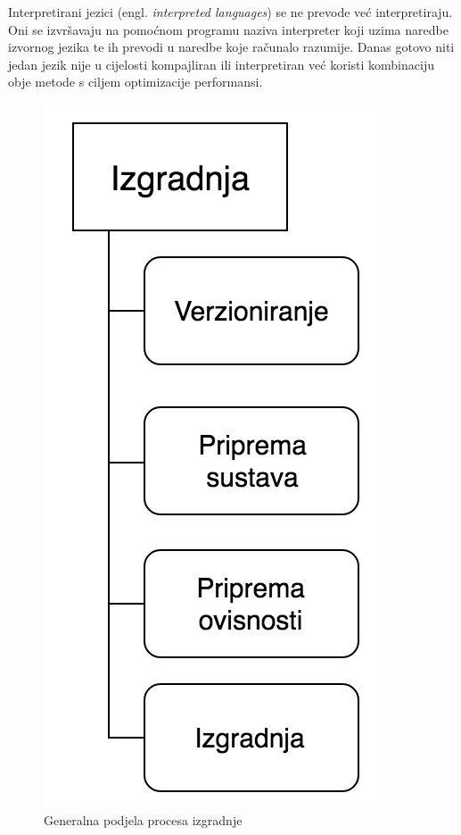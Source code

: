 \documentclass[times, utf8, diplomski, numeric]{fer}
\newcommand{\eng}[1]{(engl. \textit{#1})}
\begin{document}
Interpretirani jezici \eng{interpreted languages} se ne prevode već interpretiraju. Oni se izvršavaju na pomoćnom programu naziva interpreter koji uzima naredbe izvornog jezika te ih prevodi u naredbe koje računalo razumije. Danas gotovo niti jedan jezik nije u cijelosti kompajliran ili interpretiran već koristi kombinaciju obje metode s ciljem optimizacije performansi.

\begin{figure}
    \centering
    \includegraphics[scale=0.5]{BuildProcess}
    \caption{Generalna podjela procesa izgradnje}
    \label{fig:BuildProcess}
\end{figure}
\end{document}
